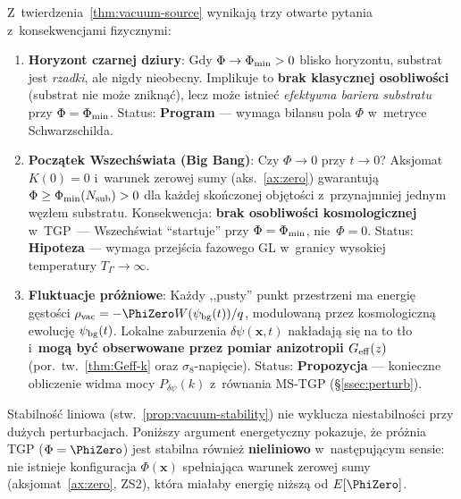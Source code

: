 \begin{remark}%
\label{rem:vacuum-source-corollaries}
Z~twierdzenia~\ref{thm:vacuum-source} wynikaj\k{a} trzy otwarte pytania
z~konsekwencjami fizycznymi:
\begin{enumerate}[nosep]
  \item \textbf{Horyzont czarnej dziury}:
    Gdy $\Phi \to \Phi_{\rm min} > 0$ blisko horyzontu, substrat jest
    \emph{rzadki}, ale nigdy nieobecny.
    Implikuje to \textbf{brak klasycznej osobliwo\'sci}
    (substrat nie mo\.ze znikn\k{a}\'c), lecz mo\.ze istnie\'c
    \emph{efektywna bariera substratu} przy $\Phi = \Phi_{\rm min}$.
    Status: \textbf{Program} --- wymaga bilansu pola $\Phi$ w~metryce Schwarzschilda.

  \item \textbf{Pocz\k{a}tek Wszech\'swiata (Big Bang)}:
    Czy $\Phi \to 0$ przy $t \to 0$?
    Aksjomat $K(0)=0$ i~warunek zerowej sumy (aks.~\ref{ax:zero})
    gwarantuj\k{a} $\Phi \geq \Phi_{\rm min}(N_{\rm sub}) > 0$
    dla ka\.zdej sko\'nczonej obj\k{e}to\'sci z~przynajmniej jednym
    w\k{e}z\l{}em substratu.
    Konsekwencja: \textbf{brak osobliwo\'sci kosmologicznej} w~TGP~---
    Wszech\'swiat ``startuje'' przy $\Phi = \Phi_{\rm min}$, nie~$\Phi = 0$.
    Status: \textbf{Hipoteza} --- wymaga przej\'scia fazowego GL w~granicy
    wysokiej temperatury $T_\Gamma \to \infty$.

  \item \textbf{Fluktuacje pr\'o\.zniowe}:
    Ka\.zdy ,,pusty'' punkt przestrzeni ma energi\k{e} g\k{e}sto\'sci
    $\rho_{\rm vac} = -\PhiZero W(\psi_{\rm bg}(t))/q$, modulowan\k{a}
    przez kosmologiczn\k{a} ewolucj\k{e} $\psi_{\rm bg}(t)$.
    Lokalne zaburzenia $\delta\psi(\mathbf{x},t)$ nak\l{}adaj\k{a} si\k{e}
    na to t\l{}o i~\textbf{mog\k{a} by\'c obserwowane przez pomiar
    anizotropii $G_{\rm eff}(z)$} (por.~tw.~\ref{thm:Geff-k}
    oraz $\sigma_8$-napi\k{e}cie).
    Status: \textbf{Propozycja} --- konieczne obliczenie widma mocy
    $P_{\delta\psi}(k)$ z~r\'ownania MS-TGP (\S\ref{ssec:perturb}).
\end{enumerate}
\end{remark}

\begin{proposition}\label{prop:nonlinear-stability}
Stabilno\'s\'c liniowa (stw.~\ref{prop:vacuum-stability})
nie wyklucza niestabilno\'sci przy du\.zych perturbacjach.
Poni\.zszy argument energetyczny pokazuje, \.ze pr\'o\.znia
TGP ($\Phi = \PhiZero$) jest stabilna r\'ownie\.z
\textbf{nieliniowo} w~nast\k{e}puj\k{a}cym sensie:
nie istnieje konfiguracja $\Phi(\mathbf{x})$ spe\l{}niaj\k{a}ca
warunek zerowej sumy (aksjomat~\ref{ax:zero}, ZS2),
kt\'ora mia\l{}aby energi\k{e} ni\.zsz\k{a} od $E[\PhiZero]$.
\end{proposition}

